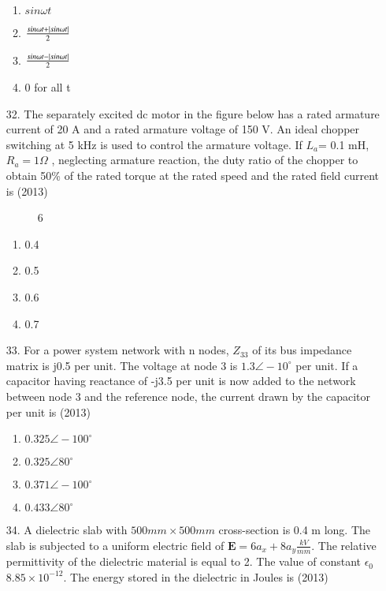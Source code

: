 \documentclass[journal]{IEEEtran}
\begin{document}
\begin{enumerate}
\begin{figure}[!ht]
    \end{figure}
    \begin{enumerate}[label=(\Alph*)]
        \item $sin\omega t$
        \item $\frac{sin\omega t+\left\vert sin\omega t\right\vert}{2}$
        \item  $\frac{sin\omega t-\left\vert sin\omega t\right\vert}{2}$
        \item 0 for all t
    \end{enumerate}
    \item[32.] The separately excited dc motor in the figure below has a rated armature current of 20 A and a rated
    armature voltage of 150 V. An ideal chopper switching at 5 kHz is used to control the armature
    voltage. If $L_a$= 0.1 mH, $R_a= 1\varOmega$ , neglecting armature reaction, the duty ratio of the chopper to
    obtain 50\% of the rated torque at the rated speed and the rated field current is \hfill (2013)
    \begin{figure}[!ht]
        \centering
        \caption{6}
    \end{figure}
    \begin{enumerate}[label=(\Alph*)]
        \item 0.4
        \item 0.5
        \item 0.6
        \item 0.7
    \end{enumerate}
    \item[33.] For a power system network with n nodes, $Z_33$ of its bus impedance matrix is j0.5 per unit. The
    voltage at node 3 is $1.3\angle-10^{\circ}$ per unit. If a capacitor having reactance of -j3.5 per unit is now
    added to the network between node 3 and the reference node, the current drawn by the capacitor per
    unit is \hfill (2013)
    \begin{enumerate}[label=(\Alph*)]
        \item $0.325\angle-100^{\circ}$
        \item $0.325\angle80^{\circ}$
        \item $0.371\angle-100^{\circ}$
        \item $0.433\angle80^{\circ}$
    \end{enumerate}
    \item[34.] A dielectric slab with $500mm\times500 mm$ cross-section is 0.4 m long. The slab is subjected to a uniform
    electric field of $\mathbf{E}=6a_x + 8a_y \frac{kV}{mm}$. The relative permittivity of the dielectric material is equal to 2. The value of constant $\epsilon_0 $ $8.85\times 10^{-12}$. The energy stored in the dielectric in Joules is \hfill (2013)
    

\end{enumerate}
\end{document}
